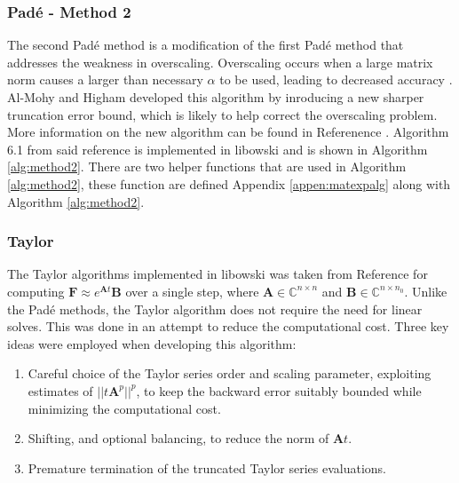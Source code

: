 \subsubsection{Pad\'e - Method 2}
The second Pad\'e method is a modification of the first Pad\'e method that addresses the weakness in overscaling. Overscaling occurs when a large matrix norm causes a larger than necessary $\alpha$ to be used, leading to decreased accuracy \cite{higham2009}. Al-Mohy and Higham developed this algorithm by inroducing a new sharper truncation error bound, which is likely to help correct the overscaling problem. More information on the new algorithm can be found in Referenence \cite{higham2009}. Algorithm 6.1 from said reference is implemented in libowski and is shown in Algorithm \ref{alg:method2}. There are two helper functions that are used in Algorithm \ref{alg:method2}, these function are defined Appendix \ref{appen:matexpalg} along with Algorithm \ref{alg:method2}. 


\subsubsection{Taylor}
The Taylor algorithms implemented in libowski was taken from Reference \cite{higham2011} for computing $\boldsymbol{F} \approx e^{\boldsymbol{A}t}\boldsymbol{B}$ over a single step, where $\boldsymbol{A} \in \mathbb{C}^{n\times n}$ and $\boldsymbol{B} \in \mathbb{C}^{n\times n_{0}}$. Unlike the Pad\'e methods, the Taylor algorithm does not require the need for linear solves. This was done in an attempt to reduce the computational cost. Three key ideas were employed when developing this algorithm:

\begin{enumerate}
    \item Careful choice of the Taylor series order and scaling parameter, exploiting estimates of $||t{\boldsymbol{A}}^{p}||^{p}$, to keep the backward error suitably bounded while minimizing the computational cost.
    \item Shifting, and optional balancing, to reduce the norm of $\boldsymbol{A}t$.
    \item Premature termination of the truncated Taylor series evaluations.
\end{enumerate}


